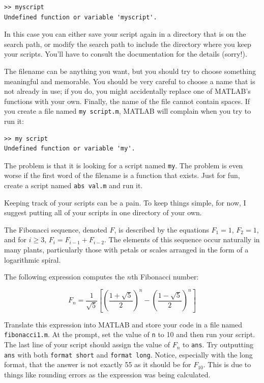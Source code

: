 \documentclass[
]{book}
\begin{document}
\begin{verbatim}
>> myscript
Undefined function or variable 'myscript'.
\end{verbatim}

In this case you can either save your script again in a directory
that is on the search path, or modify the search path to include
the directory where you keep your scripts.  You'll have to consult
the documentation for the details (sorry!).

The filename can be anything you want, but you should try to choose
something meaningful and memorable.  You should be very careful to choose a
name that is not already in use; if you do, you might accidentally
replace one of MATLAB's functions with your own.
Finally, the name of the file cannot contain spaces.  If you create
a file named {\tt my script.m}, MATLAB will complain when you try
to run it:

\begin{verbatim}
>> my script
Undefined function or variable 'my'.
\end{verbatim}

The problem is that it is looking for a script named {\tt my}.  The
problem is even worse if the first word of the filename is a function
that exists.  Just for fun, create a script named {\tt abs val.m}
and run it.

Keeping track of your scripts can be a pain.  To keep things simple,
for now, I suggest putting all of your scripts in one
directory of your own.

\begin{ex}
The Fibonacci sequence, denoted $F$, is described by the equations
$F_1 = 1$, $F_2 = 1$, and for $i \ge 3$, $F_{i} = F_{i-1} + F_{i-2}$.
The elements of this sequence occur naturally in many plants,
particularly those with petals or scales arranged in the form of a
logarithmic spiral.

The following expression computes the
$n$th Fibonacci number:

\begin{equation}
F_n = \frac{1}{\sqrt{5}}
\left[
\left( \frac{1 + \sqrt{5}}{2} \right)^{n} -
\left( \frac{1 - \sqrt{5}}{2} \right)^{n}
\right]
\end{equation}

Translate this expression into MATLAB and store your
code in a file named {\tt fibonacci1.m}.  At the prompt, set the value
of {\tt n} to 10 and then run your script.  The last line of your
script should assign the value of $F_n$ to {\tt ans}.
Try outputting {\tt ans} with both {\tt format short} and {\tt format long}.
Notice, especially with the long format, that the answer is not exactly
55 as it should be for $F_{10}$.  This is due to things like rounding errors
as the expression was being calculated.
\end{ex}
\end{document}
